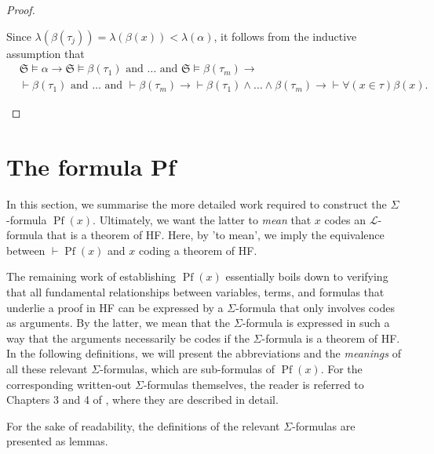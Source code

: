 \begin{proof}
\begin{itemize}
$$        $$
        Since $\lambda(\beta(\tau_j)) = \lambda(\beta(x)) < \lambda(\alpha)$, it follows 
        from the inductive assumption that
        \begin{equation*}
            \begin{split}
                & \mathfrak{S} \vDash \alpha \rightarrow 
                \mathfrak{S} \vDash \beta(\tau_1) \text{ and } \ldots \text{ and } 
                \mathfrak{S} \vDash \beta(\tau_m) \rightarrow \\
                &\vdash \beta(\tau_1) \text{ and } \ldots \text{ and } \vdash \beta(\tau_m) 
                \rightarrow
                \vdash \beta(\tau_1) \land \ldots \land \beta(\tau_m) \rightarrow
                \vdash \forall (x \in \tau) \beta(x).
            \end{split}
        \end{equation*}
    \end{itemize}
\end{proof}

\section{The formula Pf}

In this section, we summarise the more detailed work required to construct the 
$\Sigma$-formula $\operatorname{Pf}(x)$.
Ultimately, we want the latter to \textit{mean} that $x$ codes an $\mathcal{L}$-formula 
that is a theorem of HF.
Here, by 'to mean', we imply the equivalence between $\vdash \operatorname{Pf}(x)$ and
$x$ coding a theorem of HF.

The remaining work of establishing $\operatorname{Pf}(x)$ essentially boils down to verifying 
that all fundamental relationships between variables, terms, and formulas that 
underlie a proof in HF can be expressed by a $\Sigma$-formula that only involves codes as arguments.
By the latter, we mean that the $\Sigma$-formula is expressed in such a way that the arguments 
necessarily be codes if the $\Sigma$-formula is a theorem of HF.
In the following definitions, 
we will present the abbreviations and the \textit{meanings} of all these relevant 
$\Sigma$-formulas, which are sub-formulas of $\operatorname{Pf}(x)$.
For the corresponding written-out $\Sigma$-formulas themselves, the reader is
referred to Chapters 3 and 4 of \cite{swierczkowski2003finite}, where they are described in detail.

For the sake of readability, the definitions of the relevant $\Sigma$-formulas are presented
as lemmas.

